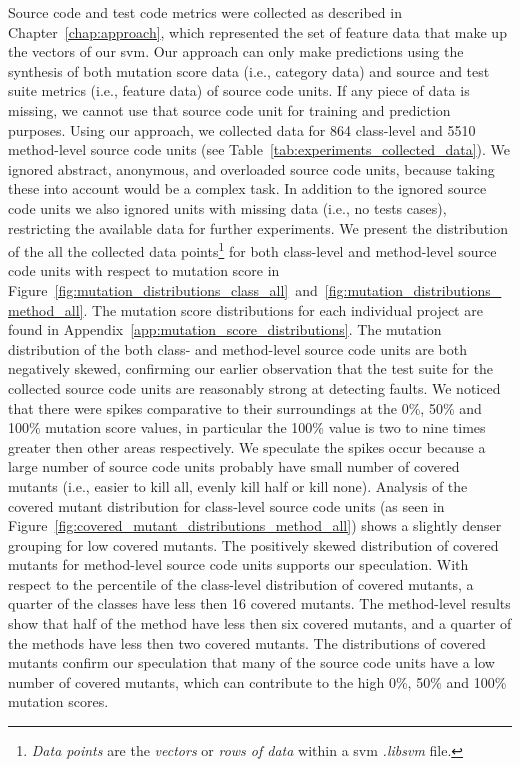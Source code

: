 Source code and test code metrics were collected as described in Chapter~\ref{chap:approach}, which represented the set of feature data that make up the vectors of our \gls{svm}. Our approach can only make predictions using the synthesis of both mutation score data (i.e., category data) and source and test suite metrics (i.e., feature data) of source code units. If any piece of data is missing, we cannot use that source code unit for training and prediction purposes. Using our approach, we collected data for 864 class-level and 5510 method-level source code units (see Table~\ref{tab:experiments_collected_data}). We ignored abstract, anonymous, and overloaded source code units, because taking these into account would be a complex task. In addition to the ignored source code units we also ignored units with missing data (i.e., no tests cases), restricting the available data for further experiments. We present the distribution of the all the collected data points\footnote{\emph{Data points} are the \emph{vectors} or \emph{rows of data} within a \gls{svm} \emph{.libsvm} file.} for both class-level and method-level source code units with respect to mutation score in Figure~\ref{fig:mutation_distributions_class_all}~and~\ref{fig:mutation_distributions_method_all}. The mutation score distributions for each individual project are found in Appendix~\ref{app:mutation_score_distributions}. The mutation distribution of the both class- and method-level source code units are both negatively skewed, confirming our earlier observation that the test suite for the collected source code units are reasonably strong at detecting faults. We noticed that there were spikes comparative to their surroundings at the  0\%, 50\% and 100\% mutation score values, in particular the 100\% value is two to nine times greater then other areas respectively. We speculate the spikes occur because a large number of source code units probably have small number of covered mutants (i.e., easier to kill all, evenly kill half or kill none). Analysis of the covered mutant distribution for class-level source code units (as seen in Figure~\ref{fig:covered_mutant_distributions_method_all}) shows a slightly denser grouping for low covered mutants. The positively skewed distribution of covered mutants for method-level source code units supports our speculation. With respect to the percentile of the class-level distribution of covered mutants, a quarter of the classes have less then 16 covered mutants. The method-level results show that half of the method have less then six covered mutants, and a quarter of the methods have less then two covered mutants. The distributions of covered mutants confirm our speculation that many of the source code units have a low number of covered mutants, which can contribute to the high 0\%, 50\% and 100\% mutation scores.

